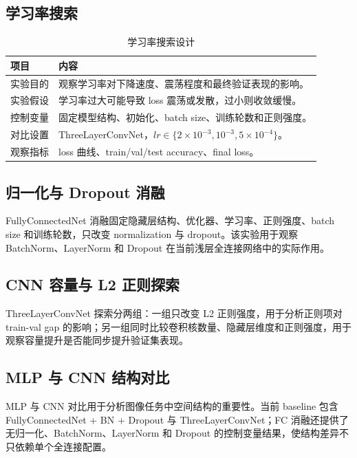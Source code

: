 \documentclass[UTF8]{ctexart}
\begin{document}
\subsection{学习率搜索}

\begin{table}[H]
\centering
\begin{tabular}{ll}
\toprule
项目 & 内容 \\
\midrule
实验目的 & 观察学习率对下降速度、震荡程度和最终验证表现的影响。 \\
实验假设 & 学习率过大可能导致 loss 震荡或发散，过小则收敛缓慢。 \\
控制变量 & 固定模型结构、初始化、batch size、训练轮数和正则强度。 \\
对比设置 & ThreeLayerConvNet，$lr \in \{2\times10^{-3}, 10^{-3}, 5\times10^{-4}\}$。 \\
观察指标 & loss 曲线、train/val/test accuracy、final loss。 \\
\bottomrule
\end{tabular}
\caption{学习率搜索设计}
\end{table}

\subsection{归一化与 Dropout 消融}

FullyConnectedNet 消融固定隐藏层结构、优化器、学习率、正则强度、batch size 和训练轮数，只改变 normalization 与 dropout。该实验用于观察 BatchNorm、LayerNorm 和 Dropout 在当前浅层全连接网络中的实际作用。

\subsection{CNN 容量与 L2 正则探索}

ThreeLayerConvNet 探索分两组：一组只改变 L2 正则强度，用于分析正则项对 train-val gap 的影响；另一组同时比较卷积核数量、隐藏层维度和正则强度，用于观察容量提升是否能同步提升验证集表现。

\subsection{MLP 与 CNN 结构对比}

MLP 与 CNN 对比用于分析图像任务中空间结构的重要性。当前 baseline 包含 FullyConnectedNet + BN + Dropout 与 ThreeLayerConvNet；FC 消融还提供了无归一化、BatchNorm、LayerNorm 和 Dropout 的控制变量结果，使结构差异不只依赖单个全连接配置。
\end{document}
